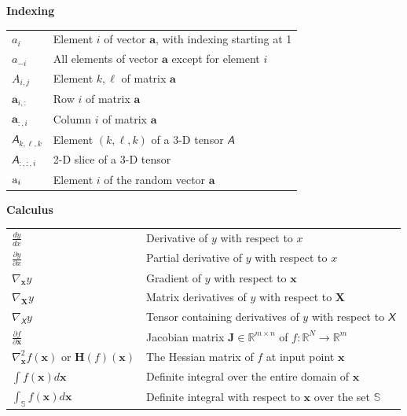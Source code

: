 \documentclass[twoside]{article}
\renewcommand{\arraystretch}{1.6}
\theoremstyle{plain}
\theoremstyle{definition}
\theoremstyle{plain}
\def\rva{{\mathbf{a}}}
\def\erva{{\textnormal{a}}}
\def\va{{\bm{a}}}
\def\vx{{\bm{x}}}
\def\eva{{a}}
\def\mH{{\bm{H}}}
\def\mJ{{\bm{J}}}
\def\mX{{\bm{X}}}
\newcommand{\tens}[1]{\bm{\mathsfit{#1}}}
\def\tA{{\tens{A}}}
\def\tX{{\tens{X}}}
\def\sS{{\mathbb{S}}}
\def\emA{{A}}
\newcommand{\etens}[1]{\mathsfit{#1}}
\def\etA{{\etens{A}}}
\newcommand{\R}{\mathbb{R}}
\begin{document}
\centerline{\bf Indexing}
\bgroup
\def\arraystretch{1.5}

\begin{tabular}{p{1.25in}p{3.25in}}
$\displaystyle \eva_i$ & Element $i$ of vector $\va$, with indexing starting at 1 \\
$\displaystyle \eva_{-i}$ & All elements of vector $\va$ except for element $i$ \\
$\displaystyle \emA_{i,j}$ & Element $k, \ell$ of matrix $\va$ \\
$\displaystyle \va_{i, :}$ & Row $i$ of matrix $\va$ \\
$\displaystyle \va_{:, i}$ & Column $i$ of matrix $\va$ \\
$\displaystyle \etA_{k, \ell, k}$ & Element $(k, \ell, k)$ of a 3-D tensor $\tA$\\
$\displaystyle \tA_{:, :, i}$ & 2-D slice of a 3-D tensor\\
$\displaystyle \erva_i$ & Element $i$ of the random vector $\rva$ \\
\end{tabular}
\egroup
\vspace{0.25cm}


\centerline{\bf Calculus}
\bgroup
\def\arraystretch{1.5}
\begin{tabular}{p{1.25in}p{3.25in}}
$\displaystyle\frac{d y} {d x}$ & Derivative of $y$ with respect to $x$\\ [2ex]
$\displaystyle \frac{\partial y} {\partial x} $ & Partial derivative of $y$ with respect to $x$ \\
$\displaystyle \nabla_\vx y $ & Gradient of $y$ with respect to $\vx$ \\
$\displaystyle \nabla_\mX y $ & Matrix derivatives of $y$ with respect to $\mX$ \\
$\displaystyle \nabla_\tX y $ & Tensor containing derivatives of $y$ with respect to $\tX$ \\
$\displaystyle \frac{\partial f}{\partial \vx} $ & Jacobian matrix $\mJ \in \R^{m\times n}$ of $f: \R^N \to \R^m$\\
$\displaystyle \nabla_\vx^2 f(\vx)\text{ or }\mH( f)(\vx)$ & The Hessian matrix of $f$ at input point $\vx$\\
$\displaystyle \int f(\vx) d\vx $ & Definite integral over the entire domain of $\vx$ \\
$\displaystyle \int_\sS f(\vx) d\vx$ & Definite integral with respect to $\vx$ over the set $\sS$ \\
\end{tabular}
\egroup
\vspace{0.25cm}
\end{document}
